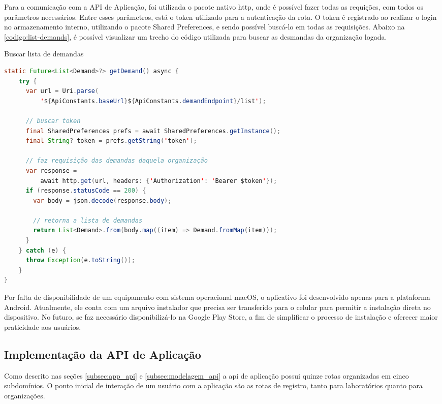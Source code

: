 Para a comunicação com a API de Aplicação, foi utilizada o pacote nativo http, onde é possível fazer todas as requições, com todos os parâmetros necessários. Entre esses parâmetros, está o token utilizado para a autenticação da rota. O token é registrado ao realizar o login no armazenamento interno, utilizando o pacote Shared Preferences, e sendo possível buscá-lo em todas as requisições. Abaixo na \autoref{codigo:list-demands}, é possível visualizar um trecho do código utilizada para buscar as desmandas da organização logada.

\begin{sourcecode}[H]
  \caption{\label{codigo:list-demands}Buscar lista de demandas}
  \begin{lstlisting}[frame=single, language=Java]
static Future<List<Demand>?> getDemand() async {
    try {
      var url = Uri.parse(
          '${ApiConstants.baseUrl}${ApiConstants.demandEndpoint}/list');
		  
	  // buscar token
      final SharedPreferences prefs = await SharedPreferences.getInstance();
      final String? token = prefs.getString('token');
	  
	  // faz requisição das demandas daquela organização
      var response =
          await http.get(url, headers: {'Authorization': 'Bearer $token'});
      if (response.statusCode == 200) {
        var body = json.decode(response.body);

		// retorna a lista de demandas
        return List<Demand>.from(body.map((item) => Demand.fromMap(item)));
      }
    } catch (e) {
	  throw Exception(e.toString());
    }
}
\end{lstlisting}
  \fonte{}
\end{sourcecode}

Por falta de disponibilidade de um equipamento com sistema operacional macOS, o aplicativo foi desenvolvido apenas para a plataforma Android. Atualmente, ele conta com um arquivo instalador que precisa ser transferido para o celular para permitir a instalação direta no dispositivo. No futuro, se faz necessário disponibilizá-lo na Google Play Store, a fim de simplificar o processo de instalação e oferecer maior praticidade aos usuários.

\subsection{Implementação da API de Aplicação}\label{subsec:api-aplicacao}

Como descrito nas seções \ref{subsec:app_api} e \ref{subsec:modelagem_api} a \gls{api} de aplicação possui quinze rotas organizadas em cinco subdomínios. O ponto inicial de interação de um usuário com a aplicação são as rotas de registro, tanto para laboratórios quanto para organizações.

